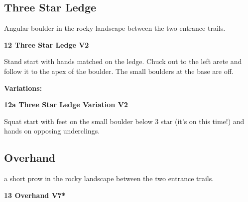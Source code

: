 \begin{multicols}{2}
			\subsection*{Three Star Ledge}\label{bf:Three Star Ledge}
			\begin{minipage}{\columnwidth}
			Angular boulder in the rocky landscape between the two entrance trails.
			\end{minipage}
			

					\begin{minipage}{\linewidth}	
					\label{rt:Three Star Ledge}
\colorbox{green!20}{
\parbox{0.95\textwidth}{
\textbf{
12 Three Star Ledge V2    
}
}
}

					\begin{adjustwidth}{0.5cm}{}				
					Stand start with hands matched on the ledge. Chuck out to the left arete and follow it to the apex of the boulder. The small boulders at the base are off.
					\end{adjustwidth}
					\end{minipage}
						\begin{adjustwidth}{0.5cm}{}				
						\textbf{Variations:} \newline
							\begin{minipage}{\linewidth}	
							\label{vr:Three Star Ledge Variation}
\colorbox{green!20}{
\parbox{0.95\textwidth}{
\textbf{
12a Three Star Ledge Variation V2    
}
}
}

							\begin{adjustwidth}{0.5cm}{}				
							Squat start with feet on the small boulder below 3 star (it's on this time!) and hands on opposing underclings.
							\end{adjustwidth}
							\end{minipage}
						\end{adjustwidth}
			\subsection*{Overhand}\label{bf:Overhand}
			\begin{minipage}{\columnwidth}
			a short prow in the rocky landscape between the two entrance trails.
			\end{minipage}
			

					\begin{minipage}{\linewidth}	
					\label{rt:Overhand}
\colorbox{Goldenrod!50}{
\parbox{0.95\textwidth}{
\textbf{
13 Overhand V7*  
}
}
}


\end{minipage}
\end{multicols}
